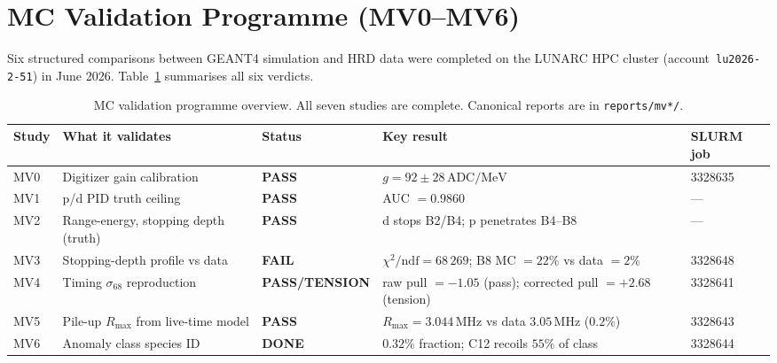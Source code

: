 \begin{table}[H]
\centering
\caption{Truth-aided study winners and interpretation.}
\label{tab:g4-winners}
\end{table}

\section{MC Validation Programme (MV0--MV6)}
\label{sec:mc-validation}

Six structured comparisons between GEANT4 simulation and HRD data were completed
on the LUNARC HPC cluster (account~\texttt{lu2026-2-51}) in June 2026.
Table~\ref{tab:mv-overview} summarises all six verdicts.

\begin{table}[H]
\centering
\footnotesize
\setlength{\tabcolsep}{4pt}
\begin{tabular}{@{}lllll@{}}
\toprule
Study & What it validates & Status & Key result & SLURM job \\
\midrule
MV0 & Digitizer gain calibration & \textbf{PASS} &
  $g = 92 \pm 28\,\text{ADC/MeV}$ & 3328635 \\
MV1 & p/d PID truth ceiling & \textbf{PASS} &
  AUC $= 0.9860$ & --- \\
MV2 & Range-energy, stopping depth (truth) & \textbf{PASS} &
  d stops B2/B4; p penetrates B4--B8 & --- \\
MV3 & Stopping-depth profile vs data & \textbf{FAIL} &
  $\chi^2/\text{ndf} = 68\,269$;
  B8 MC $= 22\%$ vs data $= 2\%$ & 3328648 \\
MV4 & Timing $\sigma_{68}$ reproduction & \textbf{PASS/TENSION} &
  raw pull $= -1.05$ (pass);
  corrected pull $= +2.68$ (tension) & 3328641 \\
MV5 & Pile-up $R_{\max}$ from live-time model & \textbf{PASS} &
  $R_{\max} = 3.044\,\text{MHz}$ vs data
  $3.05\,\text{MHz}$ ($0.2\%$) & 3328643 \\
MV6 & Anomaly class species ID & \textbf{DONE} &
  $0.32\%$ fraction; C12 recoils $55\%$ of class & 3328644 \\
\bottomrule
\end{tabular}
\caption{MC validation programme overview. All seven studies are complete.
Canonical reports are in \texttt{reports/mv*/}.}
\label{tab:mv-overview}
\end{table}

